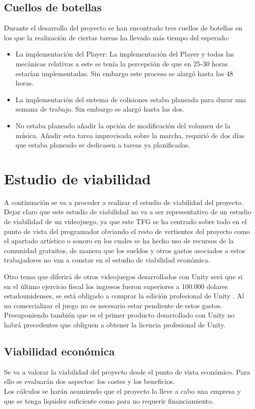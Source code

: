 \subsection{Cuellos de botellas}
Durante el desarrollo del proyecto se han encontrado tres cuellos de botellas en los que la realización de ciertas tareas ha llevado más tiempo del esperado:
\begin{itemize}
\item
La implementación del Player: La implementación del Player y todas las mecánicas relativas a este se tenía la percepción de que en 25-30 horas estarían implementadas. Sin embargo este proceso se alargó hasta las 48 horas.
\item
La implementación del sistema de colisiones estaba planeada para durar una semana de trabajo. Sin embargo se alargó hasta las dos.
\item
No estaba planeado añadir la opción de modificación del volumen de la música. Añadir esta tarea improvisada sobre la marcha, requirió de dos días que estaba planeado se dedicasen a tareas ya planificadas.
\end{itemize} 

\section{Estudio de viabilidad}
A continuación se va a proceder a realizar el estudio de viabilidad del proyecto. Dejar claro que este estudio de viabilidad no va a ser representativo de un estudio de viabilidad de un videojuego, ya que este TFG se ha centrado sobre todo en el punto de vista del programador obviando el resto de vertientes del proyecto como el apartado artístico o sonoro en los cuales se ha hecho uso de recursos de la comunidad gratuitos, de manera que los sueldos y otros gastos asociados a estos trabajadores no van a constar en el estudio de viabilidad económica.

Otro tema que diferirá de otros videojuegos desarrollados con Unity será que si en el último ejercicio fiscal los ingresos fueron superiores a 100.000 dolares estadounidenses, se está obligado a comprar la edición profesional de Unity \cite{FAQUnity}. Al no comercializar el juego no es necesario estar pendiente de estos gastos. Presuponiendo también que es el primer producto desarrollado con Unity no habrá precedentes que obliguen a obtener la licencia profesional de Unity.

\subsection{Viabilidad económica}
Se va a valorar la viabilidad del proyecto desde el punto de vista económico. Para ello se evaluarán dos aspectos: los costes y los beneficios.\\
Los cálculos se harán asumiendo que el proyecto lo lleve a cabo una empresa y que se tenga liquidez suficiente como para no requerir financiamiento.

